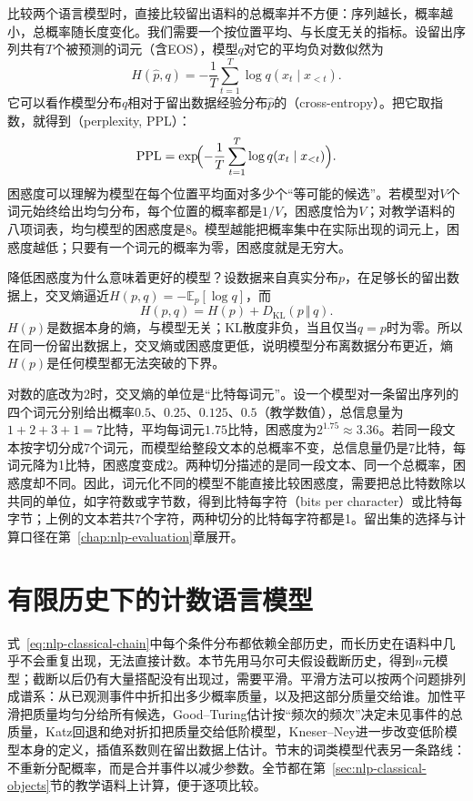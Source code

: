 比较两个语言模型时，直接比较留出语料的总概率并不方便：序列越长，概率越小，总概率随长度变化。我们需要一个按位置平均、与长度无关的指标。设留出序列共有$T$个被预测的词元（含EOS），模型$q$对它的平均负对数似然为
\begin{equation}
  H(\hat p,q)=-\frac1T\sum_{t=1}^{T}\log q(x_t\mid x_{<t}).
  \label{eq:nlp-classical-cross-entropy}
\end{equation}
它可以看作模型分布$q$相对于留出数据经验分布$\hat p$的（cross-entropy）。把它取指数，就得到（perplexity, PPL）：
\begin{equation}
  \mathrm{PPL}=\exp\!\Bigl(-\frac1T\sum_{t=1}^{T}\log q(x_t\mid x_{<t})\Bigr).
  \label{eq:nlp-classical-ppl}
\end{equation}
困惑度可以理解为模型在每个位置平均面对多少个“等可能的候选”。若模型对$V$个词元始终给出均匀分布，每个位置的概率都是$1/V$，困惑度恰为$V$；对教学语料的八项词表，均匀模型的困惑度是8。模型越能把概率集中在实际出现的词元上，困惑度越低；只要有一个词元的概率为零，困惑度就是无穷大。

降低困惑度为什么意味着更好的模型？设数据来自真实分布$p$，在足够长的留出数据上，交叉熵逼近$H(p,q)=-\mathbb E_{p}[\log q]$，而
\[
  H(p,q)=H(p)+D_{\mathrm{KL}}(p\,\Vert\, q).
\]
$H(p)$是数据本身的熵，与模型无关；KL散度非负，当且仅当$q=p$时为零。所以在同一份留出数据上，交叉熵或困惑度更低，说明模型分布离数据分布更近，熵$H(p)$是任何模型都无法突破的下界。

对数的底改为2时，交叉熵的单位是“比特每词元”。设一个模型对一条留出序列的四个词元分别给出概率$0.5$、$0.25$、$0.125$、$0.5$（教学数值），总信息量为$1+2+3+1=7$比特，平均每词元$1.75$比特，困惑度为$2^{1.75}\approx3.36$。若同一段文本按字切分成7个词元，而模型给整段文本的总概率不变，总信息量仍是7比特，每词元降为1比特，困惑度变成2。两种切分描述的是同一段文本、同一个总概率，困惑度却不同。因此，词元化不同的模型不能直接比较困惑度，需要把总比特数除以共同的单位，如字符数或字节数，得到比特每字符（bits per character）或比特每字节；上例的文本若共7个字符，两种切分的比特每字符都是1。留出集的选择与计算口径在第~\ref{chap:nlp-evaluation}章展开。

\section{有限历史下的计数语言模型}
\label{sec:nlp-classical-ngram-models}

式~\eqref{eq:nlp-classical-chain}中每个条件分布都依赖全部历史，而长历史在语料中几乎不会重复出现，无法直接计数。本节先用马尔可夫假设截断历史，得到$n$元模型；截断以后仍有大量搭配没有出现过，需要平滑。平滑方法可以按两个问题排列成谱系：从已观测事件中折扣出多少概率质量，以及把这部分质量交给谁。加性平滑把质量均匀分给所有候选，Good--Turing估计按“频次的频次”决定未见事件的总质量，Katz回退和绝对折扣把质量交给低阶模型，Kneser--Ney进一步改变低阶模型本身的定义，插值系数则在留出数据上估计。节末的词类模型代表另一条路线：不重新分配概率，而是合并事件以减少参数。全节都在第~\ref{sec:nlp-classical-objects}节的教学语料上计算，便于逐项比较。

